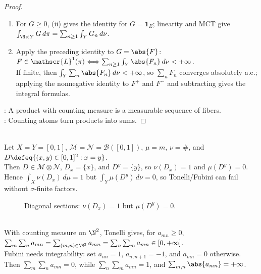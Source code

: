 \begin{proposition}
\begin{proof}
\begin{enumerate}[label=(\roman*)]
By (i), $H_a\in2^\N\otimes\mathcal{N}$, so $F$ is product-measurable.
\item[$(iv)$] For $G\geq0$, (ii) gives the identity for $G=\mathbf{1}_E$; linearity and MCT give $\int_{\N\times Y}G\,d\pi=\sum_{n\geq1}\int_YG_n\,d\nu$.
\item[$(iv)$] Apply the preceding identity to $G=\abs{F}$: $F\in\mathscr{L}^1(\pi)\Longleftrightarrow\sum_{n\geq1}\int_Y\abs{F_n}\,d\nu<+\infty$.\\
If finite, then $\int_Y\sum_n\abs{F_n}\,d\nu<+\infty$, so $\sum_nF_n$ converges absolutely a.e.; applying the nonnegative identity to $F^+$ and $F^-$ and subtracting gives the integral formulas.
\end{enumerate}
: A product with counting measure is a measurable sequence of fibers.\\
: Counting atoms turn products into sums.
\end{proof}
\end{proposition}

\begin{example} \label{ex:diagonal-counting-lebesgue-sigma-finite-failure} \\
Let $X=Y=[0,1]$, $\mathcal{M}=\mathcal{N}=\mathcal{B}([0,1])$, $\mu=m$, $\nu=\#$, and $D\defeq\{(x,y)\in[0,1]^2:x=y\}$.\\
Then $D\in\mathcal{M}\otimes\mathcal{N}$, $D_x=\{x\}$, and $D^y=\{y\}$, so $\nu(D_x)=1$ and $\mu(D^y)=0$.\\
Hence $\int_X\nu(D_x)\,d\mu=1$ but $\int_Y\mu(D^y)\,d\nu=0$, so Tonelli/Fubini can fail without $\sigma$-finite factors.
\end{example}

\begin{figure}[H]
  \centering
  
  \caption{Diagonal sections: $\nu(D_x)=1$ but $\mu(D^y)=0$.}
  \label{fig:product-diagonal-slices-counterexample}
\end{figure}

\begin{example} \label{ex:double-series-tonelli-fubini-contrast} \\
With counting measure on $\N^2$, Tonelli gives, for $a_{mn}\geq0$,\\
$\sum_m\sum_na_{mn}=\sum_{(m,n)\in\N^2}a_{mn}=\sum_n\sum_ma_{mn}\in[0,+\infty]$.\\
Fubini needs integrability: set $a_{nn}=1$, $a_{n,n+1}=-1$, and $a_{mn}=0$ otherwise.\\
Then $\sum_m\sum_na_{mn}=0$, while $\sum_n\sum_ma_{mn}=1$, and $\sum_{m,n}\abs{a_{mn}}=+\infty$.
\end{example}

